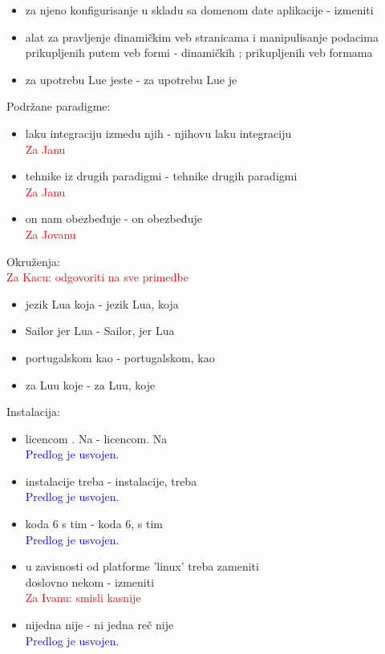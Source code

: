\documentclass[a4paper]{report}
\newcommand{\odgovorAutora}[1]{\textcolor{blue}{#1}}
\newcommand{\note}[1]{\textcolor{red}{#1}}
\begin{document}
{\begin{itemize}
  \item za njeno konfigurisanje u skladu sa domenom date aplikacije - izmeniti
  \item alat za pravljenje dinamičkim veb stranicama i manipulisanje podacima prikupljenih putem veb formi - dinamičkih ; prikupljenih veb formama
  \item  za upotrebu Lue jeste - za upotrebu Lue je
\end{itemize}
Podržane paradigme:
\begin{itemize}
  \item laku integraciju izmedu njih - njihovu laku integraciju \\
  \note{Za Janu}
  \item tehnike iz drugih paradigmi - tehnike drugih paradigmi \\
  \note{Za Janu}
  \item on nam obezbeđuje - on obezbeđuje \\
  \note{Za Jovanu}
\end{itemize}
Okruženja: \\
\note{Za Kacu: odgovoriti na sve primedbe} 
\begin{itemize}
  \item jezik Lua koja - jezik Lua, koja 
  \item Sailor jer Lua - Sailor, jer Lua 
  \item portugalskom kao - portugalskom, kao  
  \item  za Luu koje -  za Luu, koje
\end{itemize}
Instalacija:
\begin{itemize}
  \item licencom . Na - licencom. Na \\
  \odgovorAutora{Predlog je usvojen.}
  \item instalacije treba  - instalacije, treba \\
  \odgovorAutora{Predlog je usvojen.} 
  \item  koda 6 s tim -  koda 6, s tim \\
  \odgovorAutora{Predlog je usvojen.}
  \item  u zavisnosti od platforme ’linux’ treba zameniti \\ doslovno nekom - izmeniti \\
  \note{Za Ivanu: smisli kasnije}
  \item  nijedna nije - ni jedna reč nije \\
  \odgovorAutora{Predlog je usvojen.}
\end{itemize}
}
\end{document}
